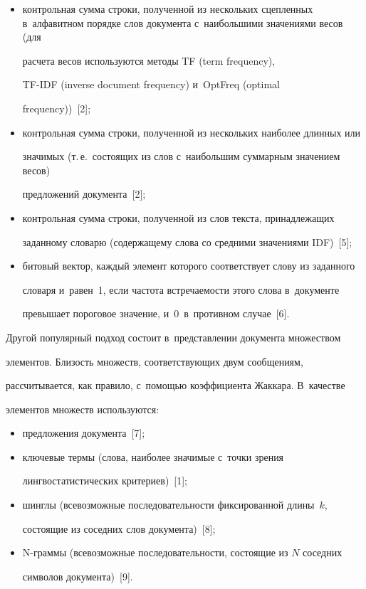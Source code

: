  \begin{itemize}

\item контрольная сумма строки, полученной из нескольких сцепленных в~алфавитном порядке слов документа с~наибольшими значениями весов (для

расчета весов используются методы TF (term frequency),

TF-IDF (inverse document frequency) и~OptFreq (optimal

frequency))~[2];

\item контрольная сумма строки, полученной из нескольких наиболее длинных или

значимых (т.\,е.\ состоящих из слов с~наибольшим суммарным значением весов)

предложений документа~[2];

\item контрольная сумма строки, полученной из слов текста, принадлежащих

заданному словарю (содержащему слова со средними значениями IDF)~[5];

\item битовый вектор, каждый элемент которого соответствует слову из заданного

словаря и~равен~1, если частота встречаемости этого слова в~документе

превышает пороговое значение, и~0~в~противном случае~[6].

  \end{itemize}



  Другой популярный подход состоит в~представлении документа множеством

элементов. Близость множеств, соответствующих двум сообщениям,

рассчитывается, как правило, с~помощью коэффициента Жаккара. В~качестве

элементов множеств используются:

  \begin{itemize}

\item предложения документа~[7];

\item ключевые термы (слова, наиболее значимые с~точки зрения

лингвостатистических критериев)~[1];

\item шинглы (всевозможные последовательности фиксированной длины~$k$,

состоящие из соседних слов документа)~[8];

\item N-граммы (всевозможные последовательности, состоящие из $N$ соседних

символов документа)~[9].

  \end{itemize}



